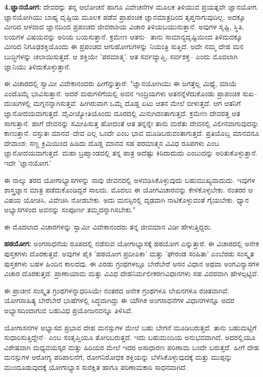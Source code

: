 \textbf{4.ಜ್ಞಾನಯೋಗ:} ದೇವರನ್ನು ತನ್ನ ಆಲೋಚನೆ ಹಾಗೂ ವಿವೇಚನೆಗಳ ಮೂಲಕ ತಿಳಿಯುವ ಪ್ರಯತ್ನವೇ ಜ್ಞಾನಯೋಗ. ಜ್ಞಾನಯೋಗಿಯು ಬಾಹ್ಯ ದೃಷ್ಟಿಯ ಮೂಲಕ ಪಡೆವ ಪ್ರಾಪಂಚಿಕ ಜ್ಞಾನಮಾತ್ರದಿಂದ ತೃಪ್ತನಾಗುವುದಿಲ್ಲ. ಅದಕ್ಕೂ ಮೀರಿದ ಆಳವಾದ ಜ್ಞಾನದಿಂದ ಪ್ರಪಂಚದ ಜೀವರಾಶಿಯ ವಿಚಾರ ತಿಳಿಯಬಯುಸುತ್ತಾನೆ. ಅವುಗಳ ಸೃಷ್ಟಿ, ಸ್ಥಿತಿ, ಲಯಗಳ ವಿಷಯವನ್ನು ಅರಿಯ ಬಯಸುತ್ತಾನೆ. ಕ್ರಮೇಣ ಆತನು– ತಾನು ಸಾಮಾನ್ಯದೃಷ್ಟಿಯಿಂದ ತಿಳಿದುದಕ್ಕೂ ಮೀರಿದ ನಿಗೂಢಶಕ್ತಿಯೊಂದು ಈ ಪ್ರಪಂಚದ ಆಗುಹೋಗುಗಳನ್ನು ನಿಯಂತ್ರಿ ಸುತ್ತಿದೆ. ಅದೇ ನಮ್ಮ ದೇಹ ಮನ ಬುದ್ಧಿಗಳನ್ನು ಚಲಾಯಿಸುತ್ತದೆ. ಆ ಶಕ್ತಿಯೇ 'ಪರಮಾತ್ಮ'. ಆತ ಸರ್ವವ್ಯಾಪ್ತಿ, ಸರ್ವಶಕ್ತ– ಎಂದು ಮೊದಲಾಗಿ ಜ್ಞಾನಿಯು ತಿಳಿದುಕೊಳ್ಳುತ್ತಾನೆ.

ಈ ವಿಚಾರದಲ್ಲಿ ಸ್ವಾಮೀ ವಿವೇಕಾನಂದರು ಹೀಗೆನ್ನುತ್ತಾರೆ: "ಜ್ಞಾನಯೋಗಿಯು ಈ ಜಗತ್ತೆಲ್ಲ ಮಿಥ್ಯೆ, ಮಾಯೆ ಎಂದೊಮ್ಮೆ ಭಾವಿಸುತ್ತಾನೆ. ಆದರೆ ಮರುಗಳಿಗೆಯಲ್ಲಿ ಅವನ ಇಂದ್ರಿಯಗಳು ಆತನನ್ನೆಳೆದುಕೊಂಡು ಪ್ರಾಪಂಚಿಕ ಸುಖ–ದುಃಖಗಳಲ್ಲಿ ಮಗ್ನನನ್ನಾಗಿಸುತ್ತವೆ. ಹೀಗಿರುವಾಗ ಒಮ್ಮೆ ದೊಡ್ಡ ಏಟು ಆತನ ಮೇಲೆ ಬೀಳುತ್ತದೆ. ಆಗ ಆತನಿಗೆ ಜ್ಞಾನೋದಯವಾಗುತ್ತದೆ. ದೈವೀಜ್ಯೋತಿಯೊಂದು ದೂರದಲ್ಲಿ ಮಿನುಗಿದಂತಾಗುತ್ತದೆ. ಕ್ರಮೇಣ ದೇವರತ್ತ ಆತ ಸಾಗುತ್ತಾನೆ. ಹಾಗೆ ದೇವನನ್ನು ಸಮೀಪಿಸುತ್ತ ಹೋದಂತೆ ಆತ ತನ್ನನ್ನೇ ತಾನು ಮರೆತು ದೇವನಲ್ಲಿ ವಿಲೀನವಾಗುವುದನ್ನು ಕಾಣುತ್ತಾನೆ. ವಸ್ತುತಃ ಮಾನವ–ದೇವ ಎಲ್ಲ ಒಂದೇ ಎಂಬ ಭಾವ ಮೂಡಿಬರುವಂತಾಗುತ್ತದೆ. ಪ್ರತಿಯೊಬ್ಬ ಮಾನವನೂ ದೇವಾಂಶ; ಸಣ್ಣ ಕ್ರಿಮಿಯಿಂದ ಹಿಡಿದು ದೊಡ್ಡ ಮಾನವ ಸಹ ಪರಮಾತ್ಮನ ವಿವಿಧ ರೂಪಗಳು ಎಂಬ ಜ್ಞಾನೋದಯವಾಗುತ್ತದೆ. ಮಹಾ ಬ್ರಹ್ಮಾಂಡದಲ್ಲಿ ತನ್ನ ಪಾತ್ರ ಅದೆಷ್ಟು ಕಿರಿದಾದುದು ಎಂಬುದನ್ನು ಅರಿತುಕೊಳ್ಳುತ್ತಾನೆ. ಇದೇ 'ಜ್ಞಾನಯೋಗ.'

ಈ ನಾಲ್ಕು ತರದ ಯೋಗಾಭ್ಯಾಸಗಳನ್ನು ನಾವು ಜೀವನದಲ್ಲಿ ಅಳವಡಿಸಿಕೊಳ್ಳುವುದು ಬಹುಮುಖ್ಯವಾದುದು. ಇವುಗಳ ಶಾಸ್ತ್ರಜ್ಞಾನ ಮಾತ್ರ ಪಡೆದುಕೊಂಡಿದ್ದರೆ ಸಾಲದು. ಮೊದಲು ಈ ಯೋಗವಿಚಾರವನ್ನು ಕೇಳಿಕೊಳ್ಳಬೇಕು. ನಂತರರ ಆ ವಿಷಯ ಯೋಚಿಸಿ, ವಿವೇಚಿಸಿ ನೋಡಬೇಕು. ಅದು ಮನಸ್ಸಿನಲ್ಲಿ ದೃಢವಾಗಿ ನಾಟಿಕೊಳ್ಳುವಂತೆ ಗೈಯಬೇಕು. ಧ್ಯಾನ ಅಭ್ಯಾಸಗಳಿಂದ ಅವನನ್ನು ಸಂಪೂರ್ಣ ತಮ್ಮದನ್ನಾಗಿಸಬೇಕು."

ಈ ಮೊದಲಾದ ವಿಚಾರಗಳನ್ನು ಸ್ವಾಮೀ ವಿವೇಕಾನಂದರು ತನ್ನ ಜೀವಮಾನ ವಿಡೀ ಹೇಳುತ್ತಿದ್ದರು.

\textbf{ಹಠಯೋಗ:} ಅಂಗಸಾಧನೆಯ ರೂಪದಲ್ಲಿ ನಡೆಸುವ ಯೋಗಾಭ್ಯಾಸಕ್ಕೆ ಹಠಯೋಗ ಎನ್ನುತ್ತಾರೆ. ಈ ವಿಚಾರದಲ್ಲಿ ಅನೇಕ ಪುಸ್ತಕಗಳು ದೊರಕುತ್ತವೆ. ಅವುಗಳ ಪೈಕಿ 'ಹಠಯೋಗ ಪ್ರದೀಪಿಕಾ' ಮತ್ತು 'ಘೇರಂಡ ಸಂಹಿತಾ' ಎಂಬೆರಡು ಸಂಸ್ಕೃತ ಪುಸ್ತಕಗಳು ಬಹಳ ಹಿಂದಿನ ಕಾಲದವು. ಈ ಎರಡು ಗ್ರಂಥಗಳಲ್ಲೂ ಬೇರೆಬೇರೆ ಆಸನ ವಿಧಾನ ಅಥವಾ ಅಂಗವಿನ್ಯಾಸಗಳ ವಿಚಾರ ದೊರಕುತ್ತದೆ. ಪ್ರಾಣಾಯಾಮ ಮತ್ತು ವಿವಿಧ ದೇಹನಿರ್ಮಲೀಕರಣವಿಧಾನಗಳು ಸಹ ವಿವರವಾಗಿ ಹೇಳಲ್ಪಟ್ಟಿವೆ.

ಈ ಪ್ರಾಚೀನ ಸಂಸ್ಕೃತ ಗ್ರಂಥಗಳನ್ನಾಧರಿಸಿಯೇ ನಂತರದ ಅನೇಕ ಗ್ರಂಥಗಳೂ ಲೇಖನಗಳೂ ರಚಿತವಾಗಿವೆ. ಯೋಗಸಾಹಿತ್ಯ ಬೇರೆಬೇರೆ ಭಾಷೆಗಳಲ್ಲಿ ಸಿದ್ಧವಾಗಿದ್ದು ಈ ಯೌಗಿಕ ಅಂಗಸಾಧನೆಗಳ ವಿಧಾನಗಳನ್ನೂ ಅದರ ಅಭ್ಯಾಸದಿಂದಾಗುವ ಬಹುವಿಧ ಪ್ರಯೋಜನವನ್ನೂ ತಿಳಿಸಿವೆ.

ಯೋಗಾಸನಗಳ ಅಭ್ಯಾಸದ ಪ್ರಭಾವ ದೇಹ ಮನಸ್ಸುಗಳ ಮೇಲೆ ಬಹು ಬೇಗನೆ ಮೂಡಿಬರುತ್ತದೆ. ತಾನು ಬಹುಮಟ್ಟಿಗೆ ಸುಧಾರಿಸುತ್ತಿದ್ದೇನೆ– ಎಂಬ ಸಂತೃಪ್ತಿಯೂ ತೋರಿಬರುತ್ತದೆ. ಇದು ಬಹುಮಂದಿಯ ಅನುಭವವಾಗಿದೆ. ಅದರಲ್ಲಿಯೂ ವಿಶೇಷವಾಗಿ ಮಧ್ಯವಯಸ್ಕರ ಮತ್ತು ಹಿರಿಯರ ಮೇಲೆ ಇದರ ಅಸಾಧಾರಣ ಪರಿಣಾಮ ಬಂದೇ ಬರುತ್ತದೆ. ಹೀಗೆ ದೇಹ ಮನಸ್ಸುಗಳ ಆರೋಗ್ಯ ಪರಿಪಾಲನೆಗೆ, ರೋಗನಿರೋಧಕ ಶಕ್ತಿಯನ್ನು ಬೆಳೆಸಿಕೊಳ್ಳುವುದಕ್ಕೆ ಮತ್ತು ಮುಪ್ಪನ್ನು ಮುಂದೂಡುವುದಕ್ಕೆ ಯೋಗಾಭ್ಯಾಸ ಸುರಕ್ಷಿತ ಹಾಗೂ ಪರಿಣಾಮಕಾರಿ ಸಾಧನವಾಗಿದೆ.

